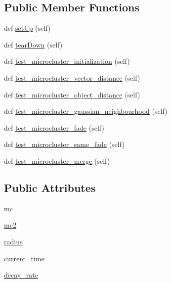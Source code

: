 \subsection*{Public Member Functions}
\begin{DoxyCompactItemize}
\item 
def \hyperlink{classMicroClusterV2Test_1_1Test_a6742aca5556286742e7d2dd701d3cdc8}{set\+Up} (self)
\item 
def \hyperlink{classMicroClusterV2Test_1_1Test_af4a995c9d42946938691284ff64353a6}{tear\+Down} (self)
\item 
def \hyperlink{classMicroClusterV2Test_1_1Test_ac2e3065ef4a5871b4398d8dfa07d657d}{test\+\_\+microcluster\+\_\+initialization} (self)
\item 
def \hyperlink{classMicroClusterV2Test_1_1Test_ad7c9873dec52bdffa6cd9b11029ff47c}{test\+\_\+microcluster\+\_\+vector\+\_\+distance} (self)
\item 
def \hyperlink{classMicroClusterV2Test_1_1Test_a0949a7ff490cfc93ffb40541e41f8ad0}{test\+\_\+microcluster\+\_\+object\+\_\+distance} (self)
\item 
def \hyperlink{classMicroClusterV2Test_1_1Test_a0add0cb1cc6bfc8b3fe9acf2d1758f64}{test\+\_\+microcluster\+\_\+gaussian\+\_\+neighbourhood} (self)
\item 
def \hyperlink{classMicroClusterV2Test_1_1Test_a06bd542840e6c7916f280f08632d13c9}{test\+\_\+microcluster\+\_\+fade} (self)
\item 
def \hyperlink{classMicroClusterV2Test_1_1Test_aee792faf2a0922cd3083bc81a997b279}{test\+\_\+microcluster\+\_\+same\+\_\+fade} (self)
\item 
def \hyperlink{classMicroClusterV2Test_1_1Test_abef35ee43c10698e36e9285a78cbbecc}{test\+\_\+microcluster\+\_\+merge} (self)
\end{DoxyCompactItemize}
\subsection*{Public Attributes}
\begin{DoxyCompactItemize}
\item 
\hyperlink{classMicroClusterV2Test_1_1Test_aa8a64ecb3360367b7d3d45a11a0107e1}{mc}
\item 
\hyperlink{classMicroClusterV2Test_1_1Test_a25b5a6b17e59b328b1654cac18a70ed7}{mc2}
\item 
\hyperlink{classMicroClusterV2Test_1_1Test_abda77c276507b80d11ad3e0d0c0438b8}{radius}
\item 
\hyperlink{classMicroClusterV2Test_1_1Test_abf02b092828d55334e90ded3616b5fc1}{current\+\_\+time}
\item 
\hyperlink{classMicroClusterV2Test_1_1Test_a8bb3b143611ac737bf184f937191cab8}{decay\+\_\+rate}
\end{DoxyCompactItemize}


